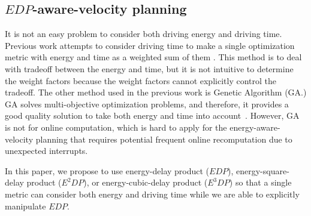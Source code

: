 \documentclass{IEEEtran}
\begin{document}
\subsection{$EDP$-aware-velocity planning} \label{sec:ed_consideration}


It is not an easy problem to consider both driving energy and driving time. Previous work attempts to consider driving time to make a single optimization metric with energy and time as a weighted sum of them \cite{Lin:ICCA14,Mensing:TR13,Dib:IVPPC11}. This method is to deal with tradeoff between the energy and time, but it is not intuitive to determine the weight factors because the weight factors cannot explicitly control the tradeoff.
The other method used in the previous work is Genetic Algorithm (GA.) GA solves multi-objective optimization problems, and therefore, it provides a good quality solution to take both energy and time into account~\cite{Dovgana:ASC14,Grossard:ISIE12}. However, GA is not for online computation, which is hard to apply for the energy-aware-velocity planning that requires potential frequent online recomputation due to unexpected interrupts. 

In this paper, we propose to use energy-delay product ($EDP$), energy-square-delay product ($E^2DP$), or energy-cubic-delay product ($E^3DP$) so that a single metric can consider both energy and driving time while we are able to explicitly manipulate $EDP$.
\end{document}
